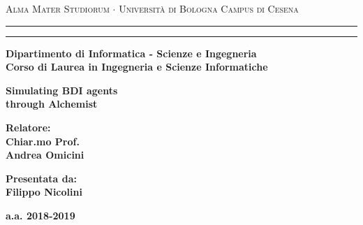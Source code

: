 \documentclass[12pt,a4paper]{report}
\begin{document}
\begin{titlepage}
\begin{center}
{{\Large{\textsc{Alma Mater Studiorum $\cdot$ Universit\`a di Bologna}}}}
{\small{\textsc{Campus di Cesena}}}
\rule[0.1cm]{15.8cm}{0.1mm}
\rule[0.5cm]{15.8cm}{0.6mm}
{\small{\bf Dipartimento di Informatica - Scienze e Ingegneria}}
\\
\medskip
{\small{\bf Corso di Laurea in Ingegneria e Scienze Informatiche}}
\end{center}
\vspace{15mm}
\begin{center}
{\LARGE{\bf Simulating BDI agents}}\\
\vspace{3mm}
{\LARGE{\bf through Alchemist}}\\
\end{center}
\vspace{40mm}
\par
\noindent
\begin{minipage}[t]{0.47\textwidth}
{\large{\bf Relatore:\\
Chiar.mo Prof.\\
Andrea Omicini}}
\end{minipage}
\hfill
\begin{minipage}[t]{0.47\textwidth}\raggedleft
{\large{\bf Presentata da:\\
Filippo Nicolini}}
\end{minipage}
\vspace{20mm}
\begin{center}
{\large{\bf
a.a. 2018-2019 }}%
\end{center}
\end{titlepage}
\end{document}
